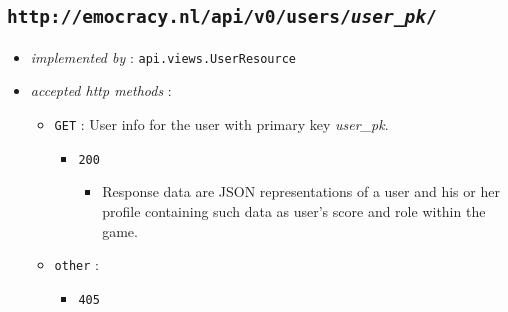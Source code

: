 \documentclass[a4paper]{report}
\begin{document}
\subsection{\texttt{http://emocracy.nl/api/v0/users/\emph{user\_pk}/}}
\begin{itemize}
    \item{\textsl{implemented by} : \texttt{api.views.UserResource}}
    \item{\textsl{accepted http methods} :
        \begin{itemize}
            \item{\texttt{GET} : User info for the user with primary key \emph{user\_pk}.
                \begin{itemize}
                    \item{\texttt{200}
                    \begin{itemize}
                        \item{Response data are JSON representations of a user and
                        his or her profile containing such data as user's score
                        and role within the game.}
                    \end{itemize}
                    }
                \end{itemize}
            }
            \item{\texttt{other} :
                \begin{itemize}
                    \item{\texttt{405}}
                \end{itemize}
            }
        \end{itemize}
    }
\end{itemize}
\end{document}
